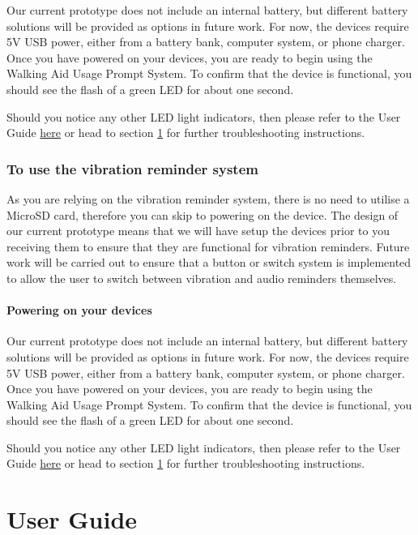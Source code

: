 				Our current prototype does not include an internal battery, but different battery solutions will be provided as options in future work. For now, the devices require 5V USB power, either from a battery bank, computer system, or phone charger. Once you have powered on your devices, you are ready to begin using the Walking Aid Usage Prompt System. To confirm that the device is functional, you should see the flash of a green LED for about one second.

				Should you notice any other LED light indicators, then please refer to the User Guide \hyperref[sec:user_guide]{here} or head to section \ref{sec:user_guide} for further troubleshooting instructions.

				\subsubsection{To use the vibration reminder system}

				As you are relying on the vibration reminder system, there is no need to utilise a MicroSD card, therefore you can skip to powering on the device. The design of our current prototype means that we will have setup the devices prior to you receiving them to ensure that they are functional for vibration reminders. Future work will be carried out to ensure that a button or switch system is implemented to allow the user to switch between vibration and audio reminders themselves.

				\paragraph{Powering on your devices}\mbox{}

				Our current prototype does not include an internal battery, but different battery solutions will be provided as options in future work. For now, the devices require 5V USB power, either from a battery bank, computer system, or phone charger. Once you have powered on your devices, you are ready to begin using the Walking Aid Usage Prompt System. To confirm that the device is functional, you should see the flash of a green LED for about one second.

				Should you notice any other LED light indicators, then please refer to the User Guide \hyperref[sec:user_guide]{here} or head to section \ref{sec:user_guide} for further troubleshooting instructions.


	\section{User Guide}
	\label{sec:user_guide}


